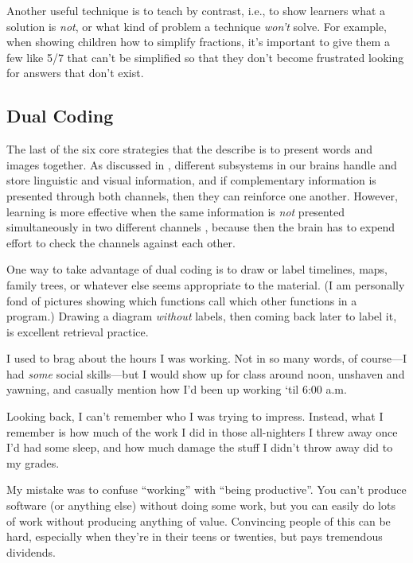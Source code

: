 Another useful technique is to teach by contrast, i.e., to show learners
what a solution is \emph{not}, or what kind of problem a technique \emph{won't}
solve. For example, when showing children how to simplify fractions,
it's important to give them a few like 5/7 that can't be simplified so
that they don't become frustrated looking for answers that don't exist.

\subsection*{Dual Coding}

The last of the six core strategies that the  describe is to present words and
images together. As discussed in ,
different subsystems in our brains handle and store linguistic and
visual information, and if complementary information is presented
through both channels, then they can reinforce one another. However,
learning is more effective when the same information is \emph{not}
presented simultaneously in two different channels
\cite{Maye2003}, because then the brain has to expend effort to
check the channels against each other.

One way to take advantage of dual coding is to draw or label timelines,
maps, family trees, or whatever else seems appropriate to the material.
(I am personally fond of pictures showing which functions call which
other functions in a program.) Drawing a diagram \emph{without} labels, then
coming back later to label it, is excellent retrieval practice.


I used to brag about the hours I was working. Not in so many words, of
course---I had \emph{some} social skills---but I would show up for class around
noon, unshaven and yawning, and casually mention how I'd been up working
`til 6:00 a.m.

Looking back, I can't remember who I was trying to impress. Instead,
what I remember is how much of the work I did in those all-nighters I
threw away once I'd had some sleep, and how much damage the stuff I
didn't throw away did to my grades.

My mistake was to confuse ``working'' with ``being productive''. You can't
produce software (or anything else) without doing some work, but you can
easily do lots of work without producing anything of value. Convincing
people of this can be hard, especially when they're in their teens or
twenties, but pays tremendous dividends.

